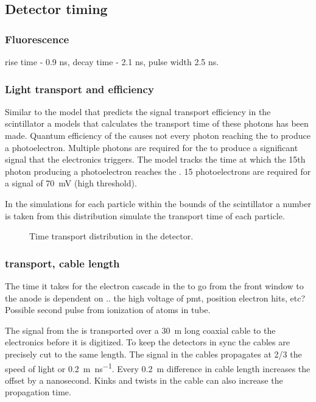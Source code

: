 \subsection{Detector timing}

\subsubsection{Fluorescence}

rise time - 0.9 ns, decay time - 2.1 ns, pulse width 2.5 ns.



\subsubsection{Light transport and \pmt efficiency}

Similar to the model that predicts the signal transport efficiency in
the scintillator a models that calculates the transport time of these
photons has been made. Quantum efficiency of the \pmt causes not every
photon reaching the \pmt to produce a photoelectron. Multiple photons
are required for the \pmt to produce a significant signal that the
\hisparc electronics triggers. The model tracks the time at which the
15th photon producing a photoelectron reaches the \pmt. 15
photoelectrons are required for a signal of \SI{70}{\milli\volt} (high
threshold).

In the simulations for each particle within the bounds of the
scintillator a number is taken from this distribution simulate the
transport time of each particle.

\begin{figure}
    \centering
    
    \caption{ Time transport
             distribution in the detector.}
    \label{fig:transport_time}
\end{figure}


\subsubsection{\pmt transport, cable length}

The time it takes for the electron cascade in the \pmt to go from the
front window to the anode is dependent on .. the high voltage of pmt,
position electron hits, etc? Possible second pulse from ionization of
atoms in tube.

The signal from the \pmt is transported over a \SI{30}{\meter} long
coaxial cable to the \hisparc electronics before it is digitized. To
keep the detectors in sync the cables are precisely cut to the
same length. The signal in the cables propagates at 2/3 the speed of
light or \SI{.2}{\meter\per\ns}. Every \SI{.2}{\meter}
difference in cable length increases the offset by a nanosecond. Kinks
and twists in the cable can also increase the propagation time.

